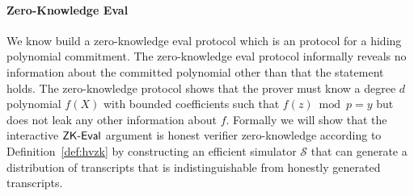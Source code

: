 \paragraph{Zero-Knowledge Eval}
We know build a zero-knowledge eval protocol which is an \eval protocol for a hiding polynomial commitment. The zero-knowledge eval protocol informally reveals no information about the committed polynomial other than that the \eval statement holds. The zero-knowledge protocol shows that the prover must know a degree $d$ polynomial $f(X)$ with bounded coefficients such that $f(z)\bmod p = y$ but does not leak any other information about $f$. Formally we will show that the interactive $\textsf{{ZK-Eval}}$ argument is honest verifier zero-knowledge according to Definition~\ref{def:hvzk} by constructing an efficient simulator $\mathcal{S}$ that can generate a distribution of transcripts that is indistinguishable from honestly generated transcripts.
\begin{comment}
	\begin{definition}[HVZK for interactive arguments]
Let $\textsf{View}_{\langle \prover(x, w), \verifier(x) \rangle}$ denote the view (list of sent and received messages) of the verifier in an interactive protocol described in Definition~\ref{def:argument} on common input $x$ and prover witness input $w$. The interactive protocol has $\delta$-statistical honest verifier zero-knowledge if there exists a probabilistic polynomial time algorithm $\mathcal{S}$ such that for every $(x, w) \in \mathcal{R}$, the distribution $\mathcal{S}(x)$ is $\delta$-close to $\textsf{View}_{\langle \prover(x, w), \verifier(x) \rangle}$ (as distributions over the randomness of $\prover$ and $\verifier$).
\end{definition}
\end{comment}


